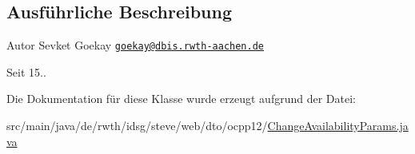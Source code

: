 \subsection{Ausführliche Beschreibung}
\begin{DoxyAuthor}{Autor}
Sevket Goekay \href{mailto:goekay@dbis.rwth-aachen.de}{\tt goekay@dbis.\+rwth-\/aachen.\+de} 
\end{DoxyAuthor}
\begin{DoxySince}{Seit}
15.. 
\end{DoxySince}


Die Dokumentation für diese Klasse wurde erzeugt aufgrund der Datei\+:\begin{DoxyCompactItemize}
\item 
src/main/java/de/rwth/idsg/steve/web/dto/ocpp12/\hyperlink{ocpp12_2_change_availability_params_8java}{Change\+Availability\+Params.\+java}\end{DoxyCompactItemize}
